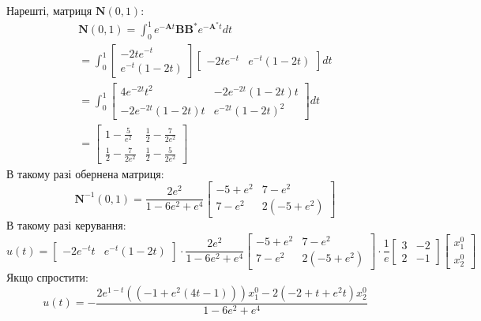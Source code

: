 \documentclass[oneside,solution]{karazin-control-assign}
\begin{document}
Нарешті, матриця $\mathbf{N}(0,1)$:
\begin{gather}
    \mathbf{N}(0,1) = \int_0^1 e^{-\mathbf{A} t}\mathbf{B}\mathbf{B}^*e^{-\mathbf{A}^* t}dt \\
    = \int_0^1 \begin{bmatrix}
        -2te^{-t} \\ e^{-t}(1-2t)
    \end{bmatrix}\begin{bmatrix}
        -2te^{-t} & e^{-t}(1-2t)
    \end{bmatrix}dt \\
    = \int_0^1\begin{bmatrix}
        4e^{-2t}t^2 & -2e^{-2t}(1-2t)t \\
        -2e^{-2t}(1-2t)t & e^{-2t}(1-2t)^2
    \end{bmatrix}dt \\
    = \begin{bmatrix}
        1 - \frac{5}{e^2} & \frac{1}{2} - \frac{7}{2e^2} \\
        \frac{1}{2}-\frac{7}{2e^2} & \frac{1}{2} - \frac{5}{2e^2}
    \end{bmatrix}
\end{gather}
В такому разі обернена матриця:
\begin{equation}
    \mathbf{N}^{-1}(0,1) = \frac{2e^2}{1-6e^2+e^4}\begin{bmatrix}
        -5+e^2 & 7-e^2 \\
        7-e^2 & 2(-5+e^2)
    \end{bmatrix}
\end{equation}
В такому разі керування:
\begin{equation*}
    u(t) = \begin{bmatrix}
        -2e^{-t}t & e^{-t}(1-2t)
    \end{bmatrix} \cdot \frac{2e^2}{1-6e^2+e^4}\begin{bmatrix}
        -5+e^2 & 7-e^2 \\
        7-e^2 & 2(-5+e^2)
    \end{bmatrix} \cdot \frac{1}{e}\begin{bmatrix}
        3 & -2 \\ 2 & -1
    \end{bmatrix}\begin{bmatrix}
        x_1^0 \\ x_2^0
    \end{bmatrix}
\end{equation*}
Якщо спростити:
\begin{equation}
    \boxed{u(t) = -\frac{2e^{1-t}((-1+e^2(4t-1)))x_1^0 - 2(-2+t+e^2t)x_2^0}{1-6e^2+e^4}}
\end{equation}
\end{document}
